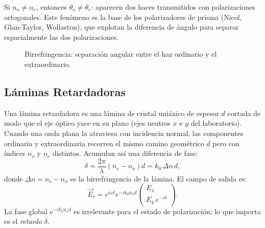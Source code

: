 \documentclass[12pt, a4paper]{article}
\theoremstyle{plain}
\theoremstyle{definition}
\theoremstyle{remark}
\newcommand{\ve}[1]{\vec{#1}}
\newcommand{\uvec}[1]{\hat{#1}}
\begin{document}
Si $n_o\neq n_e$, entonces $\theta_o\neq\theta_e$: aparecen dos haces
transmitidos con polarizaciones ortogonales. Este fenómeno es la base de los
polarizadores de prisma (Nicol, Glan-Taylor, Wollaston), que explotan la
diferencia de ángulo para separar espacialmente las dos polarizaciones.

\begin{figure}[H]
  \centering
  \caption{Birrefringencia: separación angular entre el haz ordinario y el
           extraordinario.}
  \label{fig:birrefringencia}
\end{figure}

\subsection{Láminas Retardadoras}

Una lámina retardadora es una lámina de cristal uniáxico de espesor $d$
cortada de modo que el eje óptico yace en su plano (ejes neutros $x$ e $y$
del laboratorio). Cuando una onda plana la atraviesa con incidencia normal,
las componentes ordinaria y extraordinaria recorren el mismo camino
geométrico $d$ pero con índices $n_o$ y $n_e$ distintos. Acumulan así una
diferencia de fase:
\begin{equation}
  \delta = \frac{2\pi}{\lambda}(n_e-n_o)d = k_0\,\Delta n\,d,
  \label{eq:retardador_delta}
\end{equation}
donde $\Delta n = n_e - n_o$ es la birrefringencia de la lámina. El campo
de salida es:
\begin{equation}
  \ve{E}_s
  =
  e^{i\omega t}e^{-ik_0 n_o d}
  \begin{pmatrix}
    E_x\\
    E_y\,e^{-i\delta}
  \end{pmatrix}.
\end{equation}
La fase global $e^{-ik_0 n_o d}$ es irrelevante para el estado de
polarización; lo que importa es el \emph{retardo} $\delta$.
\end{document}
